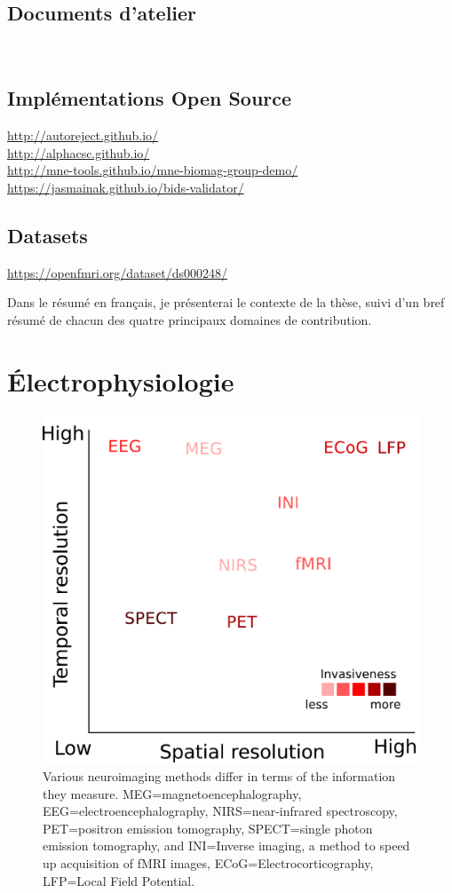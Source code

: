 \subsection*{Documents d'atelier}
\

\subsection*{Implémentations Open Source}

\url{http://autoreject.github.io/} \\
\url{http://alphacsc.github.io/} \\
\url{http://mne-tools.github.io/mne-biomag-group-demo/}\\
\url{https://jasmainak.github.io/bids-validator/}

\subsection*{Datasets}

\url{https://openfmri.org/dataset/ds000248/}

Dans le résumé en français, je présenterai le contexte de la thèse, suivi d'un bref résumé de chacun des quatre principaux domaines de contribution.

\section*{Électrophysiologie}

\begin{figure}[htb]
\begin{center}
   \includegraphics[width=0.6\linewidth]{figures/neuroimaging_methods.pdf}
\end{center}
   \caption[]{Various neuroimaging methods differ in terms of the information they measure. MEG=magnetoencephalography, EEG=electroencephalography, NIRS=near-infrared spectroscopy, PET=positron emission tomography, SPECT=single photon emission tomography, and INI=Inverse imaging, a method to speed up acquisition of fMRI images, ECoG=Electrocorticography, LFP=Local Field Potential.}
   \label{fig:sommaire:neuroimaging_methods}
\end{figure}

